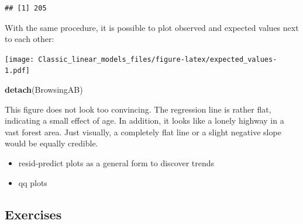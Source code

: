 \documentclass[]{svmono}
\newenvironment{Shaded}{\begin{snugshade}}{\end{snugshade}}
\newcommand{\KeywordTok}[1]{\textcolor[rgb]{0.13,0.29,0.53}{\textbf{#1}}}
\newcommand{\DataTypeTok}[1]{\textcolor[rgb]{0.13,0.29,0.53}{#1}}
\newcommand{\DecValTok}[1]{\textcolor[rgb]{0.00,0.00,0.81}{#1}}
\newcommand{\StringTok}[1]{\textcolor[rgb]{0.31,0.60,0.02}{#1}}
\newcommand{\OperatorTok}[1]{\textcolor[rgb]{0.81,0.36,0.00}{\textbf{#1}}}
\newcommand{\NormalTok}[1]{#1}
\providecommand{\tightlist}{%
  \setlength{\itemsep}{0pt}\setlength{\parskip}{0pt}}
\theoremstyle{definition}
\theoremstyle{definition}
\theoremstyle{definition}
\theoremstyle{remark}
\begin{document}
\begin{verbatim}
## [1] 205
\end{verbatim}

With the same procedure, it is possible to plot observed and expected
values next to each other:

\begin{Shaded}
\end{Shaded}

\texttt{[image: Classic\_linear\_models\_files/figure-latex/expected\_values-1.pdf]}

\begin{Shaded}
\begin{Highlighting}[]
\KeywordTok{detach}\NormalTok{(BrowsingAB)}
\end{Highlighting}
\end{Shaded}

This figure does not look too convincing. The regression line is rather
flat, indicating a small effect of age. In addition, it looks like a
lonely highway in a vast forest area. Just visually, a completely flat
line or a slight negative slope would be equally credible.

\begin{itemize}
\tightlist
\item
  resid-predict plots as a general form to discover trends
\item
  qq plots
\end{itemize}

\subsection{Exercises}\label{exercises-2}
\end{document}
